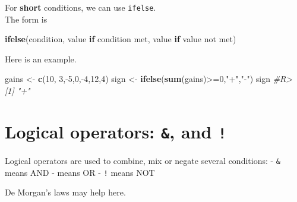 \documentclass[]{book}
\newenvironment{Shaded}{}{}
\newcommand{\CommentTok}[1]{\textcolor[rgb]{0.38,0.63,0.69}{\textit{#1}}}
\newcommand{\ControlFlowTok}[1]{\textcolor[rgb]{0.00,0.44,0.13}{\textbf{#1}}}
\newcommand{\DecValTok}[1]{\textcolor[rgb]{0.25,0.63,0.44}{#1}}
\newcommand{\KeywordTok}[1]{\textcolor[rgb]{0.00,0.44,0.13}{\textbf{#1}}}
\newcommand{\NormalTok}[1]{#1}
\newcommand{\OperatorTok}[1]{\textcolor[rgb]{0.40,0.40,0.40}{#1}}
\newcommand{\StringTok}[1]{\textcolor[rgb]{0.25,0.44,0.63}{#1}}
\theoremstyle{definition}
\theoremstyle{definition}
\theoremstyle{definition}
\theoremstyle{remark}
\begin{document}
For \textbf{short} conditions, we can use \texttt{ifelse}.\\
The form is

\begin{Shaded}
\begin{Highlighting}[]
\KeywordTok{ifelse}\NormalTok{(condition, value }\ControlFlowTok{if}\NormalTok{ condition met, value }\ControlFlowTok{if}\NormalTok{ value not met)}
\end{Highlighting}
\end{Shaded}

Here is an example.

\begin{Shaded}
\begin{Highlighting}[]
\NormalTok{gains <-}\StringTok{ }\KeywordTok{c}\NormalTok{(}\DecValTok{10}\NormalTok{, }\DecValTok{3}\NormalTok{,}\OperatorTok{-}\DecValTok{5}\NormalTok{,}\DecValTok{0}\NormalTok{,}\OperatorTok{-}\DecValTok{4}\NormalTok{,}\DecValTok{12}\NormalTok{,}\DecValTok{4}\NormalTok{)}
\NormalTok{sign <-}\StringTok{ }\KeywordTok{ifelse}\NormalTok{(}\KeywordTok{sum}\NormalTok{(gains)}\OperatorTok{>=}\DecValTok{0}\NormalTok{,}\StringTok{"+"}\NormalTok{,}\StringTok{"-"}\NormalTok{)}
\NormalTok{sign}
\CommentTok{#R> [1] "+"}
\end{Highlighting}
\end{Shaded}

\hypertarget{logical-operators-and}{%
\section{\texorpdfstring{Logical operators: \texttt{\&},
\texttt{\textbar{}} and
\texttt{!}}{Logical operators: \&, \textbar{} and !}}\label{logical-operators-and}}

Logical operators are used to combine, mix or negate several conditions:
- \texttt{\&} means AND - \texttt{\textbar{}} means OR - \texttt{!}
means NOT

De Morgan's laws may help here.
\end{document}

